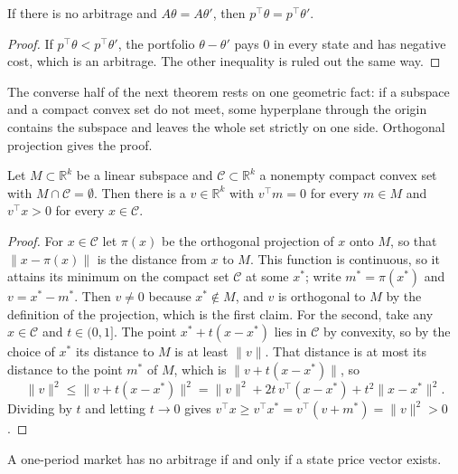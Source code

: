 \begin{chapterrefs}
\begin{proposition}\label{prop4:lop}
If there is no arbitrage and $A\theta=A\theta'$, then $p^\top\theta=p^\top\theta'$.
\end{proposition}

\begin{proof}
If $p^\top\theta<p^\top\theta'$, the portfolio $\theta-\theta'$ pays $0$ in every state and has
negative cost, which is an arbitrage. The other inequality is ruled out the same way.
\end{proof}

The converse half of the next theorem rests on one geometric fact: if a subspace and a compact convex
set do not meet, some hyperplane through the origin contains the subspace and leaves the whole set
strictly on one side. Orthogonal projection gives the proof.

\begin{lemma}[Separation]\label{lem4:sep}
Let $M\subset\mathbb R^k$ be a linear subspace and $\mathcal C\subset\mathbb R^k$ a nonempty compact convex
set with $M\cap\mathcal C=\emptyset$. Then there is a $v\in\mathbb R^k$ with $v^\top m=0$ for every $m\in M$ and
$v^\top x>0$ for every $x\in\mathcal C$.
\end{lemma}

\begin{proof}
For $x\in\mathcal C$ let $\pi(x)$ be the orthogonal projection of $x$ onto $M$, so that $\lVert x-\pi(x)\rVert$
is the distance from $x$ to $M$. This function is continuous, so it attains its minimum on the compact
set $\mathcal C$ at some
$x^*$; write $m^*=\pi(x^*)$ and $v=x^*-m^*$. Then $v\ne0$ because $x^*\notin M$, and $v$ is orthogonal
to $M$ by the definition of the projection, which is the first claim. For the second, take any
$x\in\mathcal C$ and $t\in(0,1]$. The point $x^*+t(x-x^*)$ lies in $\mathcal C$ by convexity, so by the
choice of $x^*$ its distance to $M$ is at least $\lVert v\rVert$. That distance is at most its distance
to the point $m^*$ of $M$, which is $\lVert v+t(x-x^*)\rVert$, so
\begin{equation*}
  \lVert v\rVert^2\le\lVert v+t(x-x^*)\rVert^2=\lVert v\rVert^2+2t\,v^\top(x-x^*)+t^2\lVert x-x^*\rVert^2 .
\end{equation*}
Dividing by $t$ and letting $t\to0$ gives $v^\top x\ge v^\top x^*=v^\top(v+m^*)=\lVert v\rVert^2>0$.
\end{proof}

\begin{theorem}\label{thm4:ftap}
A one-period market has no arbitrage if and only if a state price vector exists.
\end{theorem}


\end{chapterrefs}
